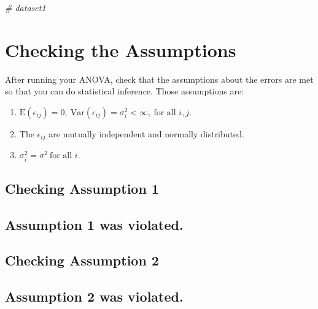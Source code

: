\documentclass[
]{book}
\newenvironment{Shaded}{\begin{snugshade}}{\end{snugshade}}
\newcommand{\CommentTok}[1]{\textcolor[rgb]{0.56,0.35,0.01}{\textit{#1}}}
\providecommand{\tightlist}{%
  \setlength{\itemsep}{0pt}\setlength{\parskip}{0pt}}
\begin{document}
\begin{Shaded}
\begin{Highlighting}[]
\CommentTok{\# dataset1}
\end{Highlighting}
\end{Shaded}

\hypertarget{checking-the-assumptions}{%
\section{Checking the Assumptions}\label{checking-the-assumptions}}

After running your ANOVA, check that the assumptions about the errors
are met so that you can do statistical inference. Those assumptions are:

\begin{enumerate}
\def\labelenumi{\arabic{enumi}.}
\tightlist
\item
  \(\text{E}(\epsilon_{ij})=0,\ \text{Var}(\epsilon_{ij})=\sigma_{i}^2 < \infty,\ \text{for all }i, j.\)
\item
  The \(\epsilon_{ij}\) are mutually independent and normally
  distributed.
\item
  \(\sigma_{i}^2=\sigma^2\ \text{for all } i.\)
\end{enumerate}

\hypertarget{checking-assumption-1}{%
\subsection{Checking Assumption 1}\label{checking-assumption-1}}

\hypertarget{assumption-1-was-violated.}{%
\subsection{Assumption 1 was violated.}\label{assumption-1-was-violated.}}

\hypertarget{checking-assumption-2}{%
\subsection{Checking Assumption 2}\label{checking-assumption-2}}

\hypertarget{assumption-2-was-violated.}{%
\subsection{Assumption 2 was violated.}\label{assumption-2-was-violated.}}
\end{document}
